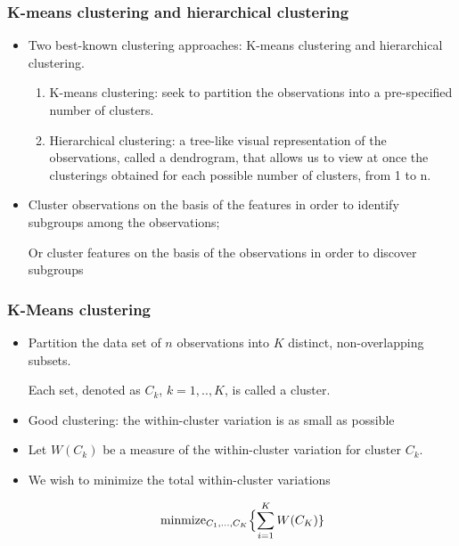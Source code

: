 \documentclass{beamer}
\begin{document}
   	      
   	      
   	      
   	      \begin{frame}
   	      	\frametitle{ K-means clustering and hierarchical clustering }
   	      	\begin{itemize}
   	      		
   	   \item  Two best-known
   		clustering approaches: K-means clustering and hierarchical clustering.  
   		\begin{enumerate}
   		\item K-means clustering:  seek to partition the observations into a pre-specified
   		number of clusters. 
   		\item Hierarchical clustering: 
   		a tree-like visual representation of the observations, called a {\color{red} dendrogram},
   		that allows us to view at once the clusterings obtained for each possible
   		number of clusters, from 1 to n. 
   		\end{enumerate}
   		 \item
   		Cluster observations on the basis of the features in
   		order to identify subgroups among the observations;
   		
   		Or cluster features
   		on the basis of the observations in order to discover subgroups
   		
     	\end{itemize}
     \end{frame}    
     
    
     
     
     \begin{frame}
     	\frametitle{K-Means clustering}
     	\begin{itemize}
     		\item Partition the data set of $n$ observations into $K$ distinct, non-overlapping subsets.
     		
     		Each set, denoted as $C_k$, $k=1, .., K$,  is called a cluster.
     		
     		\item Good clustering:  the
     		within-cluster variation is as small as possible
     		
     		\item Let $W(C_k)$ be a measure of the within-cluster variation for cluster $C_k$.
     		
     		\item We wish to minimize the total within-cluster variations 
     		
     		$$ \hbox{minmize}_{C_1, ..., C_K} \Bigl\{ \sum_{i=1}^K W(C_K)\}$$
     		
     			\end{itemize}
     		\end{frame} 
     		
\end{document}

